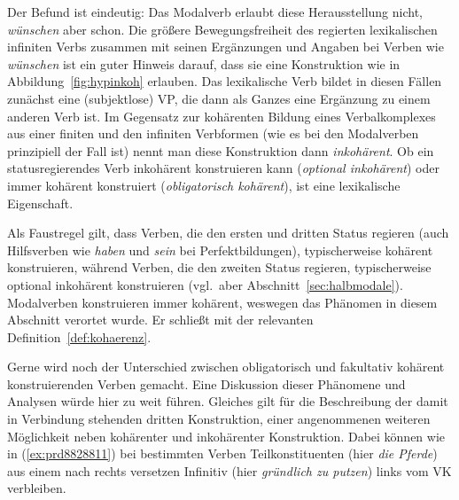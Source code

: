 \begin{exe}
  \ex\label{ex:prd9201} 
  \begin{xlist}
  \end{xlist}
\end{exe}

Der Befund ist eindeutig:
Das Modalverb erlaubt diese Herausstellung nicht, \textit{wünschen} aber schon.
Die größere Bewegungsfreiheit des regierten lexikalischen infiniten Verbs zusammen mit seinen Ergänzungen und Angaben bei Verben wie \textit{wünschen} ist ein guter Hinweis darauf, dass sie eine Konstruktion wie in Abbildung~\ref{fig:hypinkoh} erlauben.
Das lexikalische Verb bildet in diesen Fällen zunächst eine (subjektlose) VP, die dann als Ganzes eine Ergänzung zu einem anderen Verb ist.
Im Gegensatz zur kohärenten Bildung eines Verbalkomplexes aus einer finiten und den infiniten Verbformen (wie es bei den Modalverben prinzipiell der Fall ist) nennt man diese Konstruktion dann \textit{inkohärent}.
Ob ein statusregierendes Verb inkohärent konstruieren kann (\textit{optional inkohärent}) oder immer kohärent konstruiert (\textit{obligatorisch kohärent}), ist eine lexikalische Eigenschaft.

Als Faustregel gilt, dass Verben, die den ersten und dritten Status regieren (\zB auch Hilfsverben wie \textit{haben} und \textit{sein} bei Perfektbildungen), typischerweise kohärent konstruieren, während Verben, die den zweiten Status regieren, typischerweise optional inkohärent konstruieren (vgl.\ aber \zB Abschnitt~\ref{sec:halbmodale}).
Modalverben konstruieren immer kohärent, weswegen das Phänomen in diesem Abschnitt verortet wurde.
Er schließt mit der relevanten Definition~\ref{def:kohaerenz}.


Gerne wird noch der Unterschied zwischen obligatorisch und fakultativ kohärent konstruierenden Verben gemacht.
Eine Diskussion dieser Phänomene und Analysen würde hier zu weit führen.
Gleiches gilt für die Beschreibung der damit in Verbindung stehenden dritten Konstruktion, einer angenommenen weiteren Möglichkeit neben kohärenter und inkohärenter Konstruktion.
Dabei können wie in (\ref{ex:prd8828811}) bei bestimmten Verben Teilkonstituenten (hier \textit{die Pferde}) aus einem nach rechts versetzen Infinitiv (hier \textit{gründlich zu putzen}) links vom VK verbleiben.

